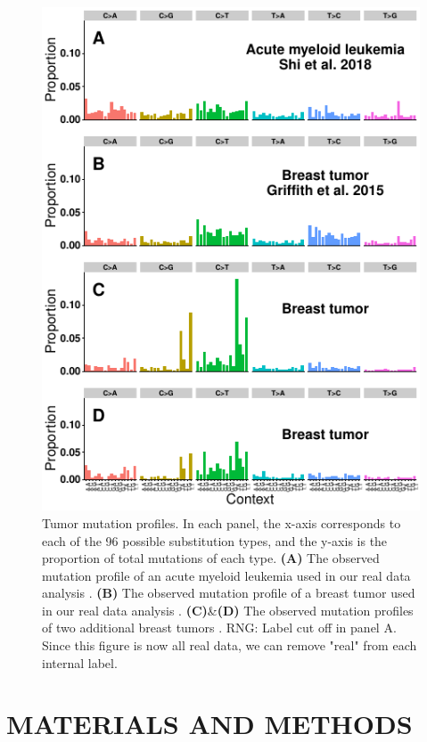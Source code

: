 \documentclass[a4,center,fleqn]{NAR}
\newcommand{\rngcomment}[1]{{\color{red}RNG: #1}}
\begin{document}
\begin{figure}
  \begin{center}
  \includegraphics{figures/real_signatures_only.pdf}
  \end{center}
  \caption{Tumor mutation profiles.
  In each panel, the x-axis corresponds to each of the 96 possible substitution types, and the y-axis is the proportion of total mutations of each type.
  \textbf{(A)} The observed mutation profile of an acute myeloid leukemia used in our real data analysis \cite{Griffith2015}.
  \textbf{(B)} The observed mutation profile of a breast tumor used in our real data analysis \cite{Shi2018}.
  \textbf{(C)}\&\textbf{(D)} The observed mutation profiles of two additional breast tumors \cite{Alexandrov2019}.
  \rngcomment{Label cut off in panel A. Since this figure is now all real data, we can remove "real" from each internal label.}
   }
  \label{NAR-realsigfig}
 \end{figure}

\section{MATERIALS AND METHODS}
\end{document}
